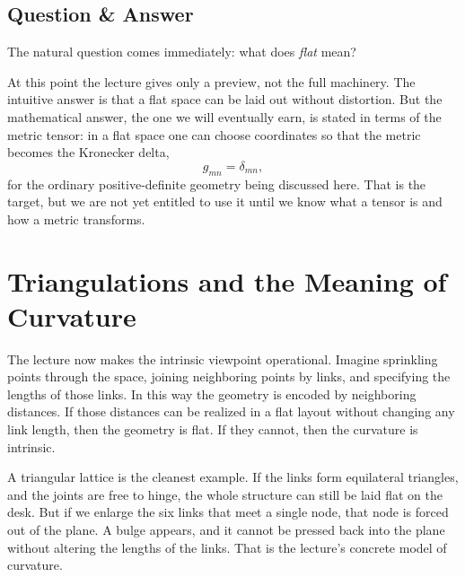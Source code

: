 \subsection{Question \& Answer}

The natural question comes immediately: what does \emph{flat} mean?

At this point the lecture gives only a preview, not the full machinery. The intuitive answer is that a flat space can be laid out without distortion. But the mathematical answer, the one we will eventually earn, is stated in terms of the metric tensor: in a flat space one can choose coordinates so that the metric becomes the Kronecker delta,
\begin{equation}
g_{mn} = \delta_{mn},
\end{equation}
for the ordinary positive-definite geometry being discussed here. That is the target, but we are not yet entitled to use it until we know what a tensor is and how a metric transforms.

\section{Triangulations and the Meaning of Curvature}

The lecture now makes the intrinsic viewpoint operational. Imagine sprinkling points through the space, joining neighboring points by links, and specifying the lengths of those links. In this way the geometry is encoded by neighboring distances. If those distances can be realized in a flat layout without changing any link length, then the geometry is flat. If they cannot, then the curvature is intrinsic.

A triangular lattice is the cleanest example. If the links form equilateral triangles, and the joints are free to hinge, the whole structure can still be laid flat on the desk. But if we enlarge the six links that meet a single node, that node is forced out of the plane. A bulge appears, and it cannot be pressed back into the plane without altering the lengths of the links. That is the lecture's concrete model of curvature.

